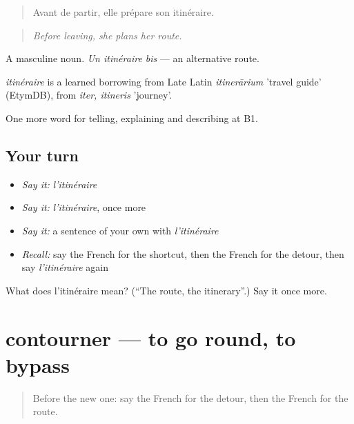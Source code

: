 \begin{quote}
Avant de partir, elle prépare son itinéraire.
\end{quote}

\begin{quote}
\emph{Before leaving, she plans her route.}
\end{quote}

A masculine noun. \emph{Un itinéraire bis} — an alternative route.

\begin{cousinweb}
\emph{itinéraire} is a learned borrowing from Late Latin \emph{itinerārium} 'travel guide' (EtymDB), from \emph{iter, itineris} 'journey'.
\end{cousinweb}

\begin{grammarlens}[title={What you've built}]
One more word for telling, explaining and describing at B1.
\end{grammarlens}

\subsection*{Your turn}
\begin{itemize}
\raggedright
  \item \emph{Say it:} \emph{l'itinéraire}
  \item \emph{Say it:} \emph{l'itinéraire}, once more
  \item \emph{Say it:} a sentence of your own with \emph{l'itinéraire}
  \item \emph{Recall:} say the French for the shortcut, then the French for the detour, then say \emph{l'itinéraire} again
\end{itemize}

\begin{tcolorbox}[breakable,colback=teal!4,colframe=teal!35!black,title={Before you move on}]
What does l'itinéraire mean? (\textquotedblleft{}The route, the itinerary\textquotedblright{}.) Say it once more.
\end{tcolorbox}
\section[contourner]{contourner — to go round, to bypass}

\label{lesson:FR-C436-contourner}



\begin{quote}
Before the new one: say the French for the detour, then the French for the route.
\end{quote}


